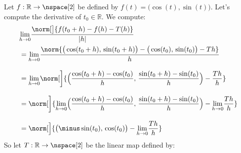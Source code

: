 \documentclass{book}                                                            %
\begin{document}
                \begin{example}
                    Let $f:\mathbb{R}\rightarrow\nspace[2]$ be defined by
                    $f(t)=\big(\cos(t),\sin(t)\big)$. Let's compute the
                    derivative of $t_{0}\in\mathbb{R}$. We compute:
                    \begin{subequations}
                        \begin{align}
                            &\nonumber\underset{h\rightarrow{0}}{\lim}
                                \frac{%
                                    \norm[\big]{%
                                        f(t_{0}+h)-f(h)-T(h)
                                    }
                                }{|h|}\\
                            &=\underset{h\rightarrow{0}}{\lim}
                            \frac{%
                                \norm{%
                                    \big(\cos(t_{0}+h),\,\sin(t_{0}+h)\big)-
                                    \big(\cos(t_{0}),\,\sin(t_{0})\big)-Th%
                                }%
                            }{h}\\[2ex]
                            &=\underset{h\rightarrow{0}}{\lim}\norm[\bigg]{%
                                \Big(%
                                    \frac{\cos(t_{0}+h)-\cos(t_{0})}{h},\,
                                    \frac{\sin(t_{0}+h)-\sin(t_{0})}{h}
                                \Big)-\frac{Th}{h}
                            }\\[2ex]
                            &=\norm[\bigg]{%
                                \underset{h\rightarrow{0}}{\lim}\Big(%
                                    \frac{\cos(t_{0}+h)-\cos(t_{0})}{h},\,
                                    \frac{\sin(t_{0}+h)-\sin(t_{0})}{h}
                                \Big)
                                -\underset{h\rightarrow{0}}{\lim}\frac{Th}{h}
                            }\\[2ex]
                            &=\norm[\Big]{%
                                \big(\minus\sin(t_{0}),\,\cos(t_{0})\big)-
                                \underset{h\rightarrow{0}}{\lim}\frac{Th}{h}
                            }
                        \end{align}
                    \end{subequations}
                    So let $T:\mathbb{R}\rightarrow\nspace[2]$ be the linear map
                    defined by:
                    \begin{equation}

\end{equation}
\end{example}
\end{document}
